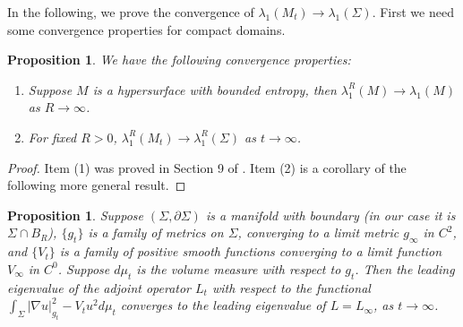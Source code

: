 \documentclass[12pt]{amsart}
\numberwithin{equation}{section}
\newtheorem{proposition}[theorem]{Proposition}
\numberwithin{equation}{section}
\begin{document}
	In the following, we prove the convergence of $\lambda_1(M_t)\to\lambda_1(\Sigma)$. First we need some convergence properties for compact domains.
	
	\begin{proposition}\label{LmEigenfunctions}
		We have the following convergence properties:
		\begin{enumerate} 
			\item  Suppose $M$ is a hypersurface with bounded entropy, then $\lambda_1^R(M)\to \lambda_1(M)$ as $R\to\infty$. 
			\item For fixed $R>0$, $\lambda^R_1(M_t)\to \lambda^R_1(\Sigma)$ as $t\to\infty$.
		\end{enumerate}
	\end{proposition}
	\begin{proof}
		Item (1) was proved in Section 9 of \cite{CM1}. Item (2) is a corollary of the following more general result. 
	\end{proof}
	\begin{proposition}\label{thm:CptEigenConv}
		Suppose $(\Sigma,\partial\Sigma)$ is a manifold with boundary (in our case it is $\Sigma\cap B_R$), $\{g_t\}$ is a family of metrics on $\Sigma$, converging to a limit metric $g_\infty$ in $C^{2}$, and $\{V_t\}$ is a family of positive smooth functions converging to a limit function $V_\infty$ in $C^0$. Suppose $d\mu_t$ is the volume measure with respect to $g_t$. Then the leading eigenvalue of the adjoint operator $L_t$ with respect to the functional
		$	\int_\Sigma |\nabla u|_{g_t}^2-V_t u^2 d\mu_t$
		converges to the leading eigenvalue of $L=L_\infty$, as $t\to\infty$.
	\end{proposition}
	
\end{document}
